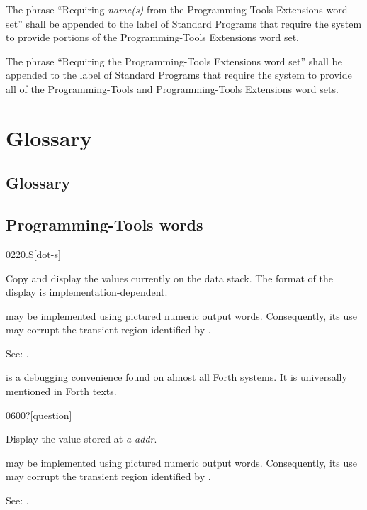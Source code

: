 The phrase ``Requiring \emph{name(s)} from the Programming-Tools
Extensions word set'' shall be appended to the label of Standard
Programs that require the system to provide portions of the
Programming-Tools Extensions word set.

The phrase ``Requiring the Programming-Tools Extensions word set''
shall be appended to the label of Standard Programs that require the
system to provide all of the Programming-Tools and Programming-Tools
Extensions word sets.



\section{Glossary} %

\begin{info}
\subsection{Glossary} %
\end{info}

\subsection{Programming-Tools words} %

\begin{newword}{0220}{.S}[dot-s]
	\stack{}{}

	Copy and display the values currently on the data stack. The
	format of the display is implementation-dependent.

	 may be implemented using pictured numeric output words.
	Consequently, its use may corrupt the transient region identified
	by .

\item[See:]
	.

	\begin{rationale} %
		 is a debugging convenience found on almost
		all Forth systems. It is universally mentioned in Forth texts.
	\end{rationale}
\end{newword}


\begin{newword}{0600}{?}[question]

	Display the value stored at \emph{a-addr}.

	 may be implemented using pictured numeric output words.
	Consequently, its use may corrupt the transient region identified
	by .

\item[See:]
	.
\end{newword}


